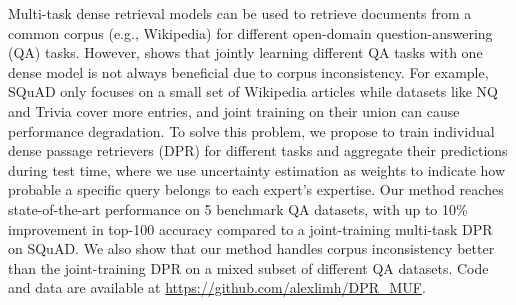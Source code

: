 Multi-task dense retrieval models can be used to retrieve documents from a common corpus (e.g., Wikipedia) for different open-domain question-answering (QA) tasks. However, \citet{karpukhin-etal-2020-dpr} shows that jointly learning different QA tasks with one dense model is not always beneficial due to corpus inconsistency. For example, SQuAD only focuses on a small set of Wikipedia articles while datasets like NQ and Trivia cover more entries, and joint training on their union can cause performance degradation. To solve this problem, we propose to train individual dense passage retrievers (DPR) for different tasks and aggregate their predictions during test time, where we use uncertainty estimation as weights to indicate how probable a specific query belongs to each expert's expertise. Our method reaches state-of-the-art performance on 5 benchmark QA datasets, with up to 10\% improvement in top-100 accuracy compared to a joint-training multi-task DPR on SQuAD. We also show that our method handles corpus inconsistency better than the joint-training DPR on a mixed subset of different QA datasets. Code and data are available at \url{https://github.com/alexlimh/DPR\_MUF}.
